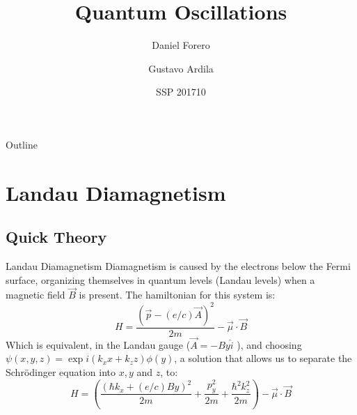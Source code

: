 \documentclass{beamer}
\title{Quantum Oscillations}
\author{Daniel Forero\inst{1} \and Gustavo Ardila\inst{1}}
\institute[Universidad de Los Andes] %
{
  \inst{1}%
  Physics Department\\
  Universidad de Los Andes
  }
\date{SSP 201710}
\begin{document}
\begin{frame}
  \titlepage
\end{frame}

\begin{frame}{Outline}
  \tableofcontents
\end{frame}

\section{Landau Diamagnetism}

\subsection{Quick Theory}

\begin{frame}{Landau Diamagnetism}
  Diamagnetism is caused by the electrons below the Fermi surface, organizing themselves in quantum levels (Landau levels) when a magnetic field $\vec{B}$ is present. The hamiltonian for this system is:
  \begin{equation}
      H=\frac{(\vec{p}-(e/c)\vec{A})^2}{2m} - \vec{\mu}\cdot\vec{B}
      \label{eq:min_ham}
  \end{equation}
  Which is equivalent, in the Landau gauge ($\vec{A} = -By \hat{i}$ ), and choosing $\psi(x, y, z)=\exp{i(k_xx+k_zz)}\phi(y)$, a solution that allows us to separate the Schrödinger equation into $x, y$ and $z$, to:
  \begin{equation}
      H= \left(\frac{(\hbar k_x+(e/c)By)^2}{2m}+\frac{p_y^2}{2m}+\frac{\hbar^2 k_z^2}{2m}\right)- \vec{\mu}\cdot\vec{B}
      \label{eq:min_ham_gauge}
  \end{equation}
\end{frame}
\end{document}
